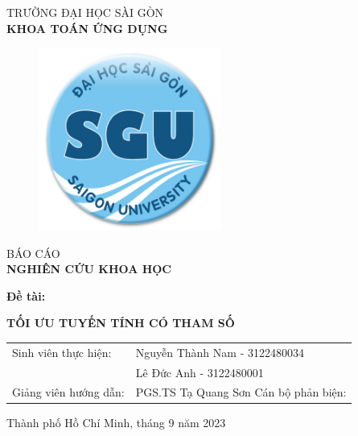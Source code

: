 \documentclass{article} %
\begin{document}
\cleardoublepage
\thispagestyle{empty}
\begin{center}
    \vspace{-15pt} TRƯỜNG ĐẠI HỌC SÀI GÒN\\
    \textbf{\fontsize{16pt}{0pt}\selectfont KHOA TOÁN ỨNG DỤNG}
    \vspace{0.5cm}
\begin{figure}[H]
        \centering
        \includegraphics[width=6cm,height=6cm]{bianckh.png}
\end{figure}
    \vspace{1.5cm}
    \fontsize{24pt}{0pt}\selectfont BÁO CÁO\\
    \vspace{12pt}
    \textbf{\fontsize{32pt}{0pt}\selectfont NGHIÊN CỨU KHOA HỌC}
    \vspace{1.5cm}
\end{center}
    \hspace{20pt}\textbf{\fontsize{14pt}{0pt}\selectfont Đề tài:}
\begin{center}
    \textbf{\fontsize{20pt}{0pt}\selectfont TỐI ƯU TUYẾN TÍNH CÓ THAM SỐ} 
    \vspace{1cm}
\begin{table}[H]
        \centering
        \begin{tabular}{l l}
    \fontsize{14pt}{0pt}\selectfont Sinh viên thực hiện:     & \fontsize{14pt}{0pt}\selectfont Nguyễn Thành Nam - 3122480034 \vspace{6pt}\\     
                                                             & \fontsize{14pt}{0pt}\selectfont Lê Đức Anh - 3122480001 \vspace{6pt}\\
    \fontsize{14pt}{0pt}\selectfont Giảng viên hướng dẫn: & \fontsize{14pt}{0pt}\selectfont PGS.TS Tạ Quang Sơn
Cán bộ phản biện: &
\end{tabular}
\end{table}
    \vspace{1.5cm}
    \fontsize{14pt}{0pt}\selectfont Thành phố Hồ Chí Minh, tháng 9 năm 2023
\end{center}
\cleardoublepage
\end{document}
